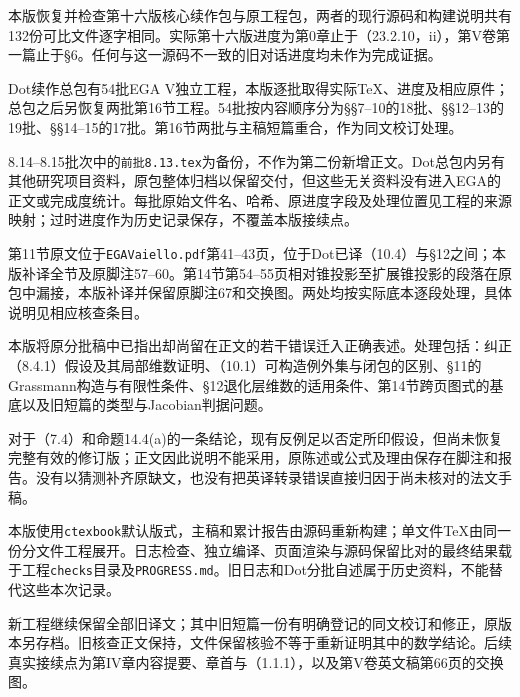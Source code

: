 本版恢复并检查第十六版核心续作包与原工程包，两者的现行源码和构建说明共有132份可比文件逐字相同。实际第十六版进度为第0章止于（23.2.10，ii），第V卷第一篇止于§6。任何与这一源码不一致的旧对话进度均未作为完成证据。

Dot续作总包有54批EGA V独立工程，本版逐批取得实际TeX、进度及相应原件；总包之后另恢复两批第16节工程。54批按内容顺序分为§§7--10的18批、§§12--13的19批、§§14--15的17批。第16节两批与主稿短篇重合，作为同文校订处理。

8.14--8.15批次中的\texttt{前批8.13.tex}为备份，不作为第二份新增正文。Dot总包内另有其他研究项目资料，原包整体归档以保留交付，但这些无关资料没有进入EGA的正文或完成度统计。每批原始文件名、哈希、原进度字段及处理位置见工程的来源映射；过时进度作为历史记录保存，不覆盖本版接续点。

第11节原文位于\texttt{EGAVaiello.pdf}第41--43页，位于Dot已译（10.4）与§12之间；本版补译全节及原脚注57--60。第14节第54--55页相对锥投影至扩展锥投影的段落在原包中漏接，本版补译并保留原脚注67和交换图。两处均按实际底本逐段处理，具体说明见相应核查条目。

本版将原分批稿中已指出却尚留在正文的若干错误迁入正确表述。处理包括：纠正（8.4.1）假设及其局部维数证明、（10.1）可构造例外集与闭包的区别、§11的Grassmann构造与有限性条件、§12退化层维数的适用条件、第14节跨页图式的基底以及旧短篇的类型与Jacobian判据问题。

对于（7.4）和命题14.4(a)的一条结论，现有反例足以否定所印假设，但尚未恢复完整有效的修订版；正文因此说明不能采用，原陈述或公式及理由保存在脚注和报告。没有以猜测补齐原缺文，也没有把英译转录错误直接归因于尚未核对的法文手稿。

本版使用\texttt{ctexbook}默认版式，主稿和累计报告由源码重新构建；单文件TeX由同一份分文件工程展开。日志检查、独立编译、页面渲染与源码保留比对的最终结果载于工程\texttt{checks}目录及\texttt{PROGRESS.md}。旧日志和Dot分批自述属于历史资料，不能替代这些本次记录。

新工程继续保留全部旧译文；其中旧短篇一份有明确登记的同文校订和修正，原版本另存档。旧核查正文保持，文件保留核验不等于重新证明其中的数学结论。后续真实接续点为第IV章内容提要、章首与（1.1.1），以及第V卷英文稿第66页的交换图。

